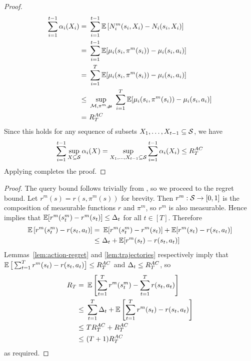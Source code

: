 \begin{proof}
\begin{align*}
\sum_{i=1}^{t-1} \alpha_i(X_i) =&\ \sum_{i=1}^{t-1} \operatorname*{\mathbb{E}}\left[N_i^m(s_i, X_i) - N_i(s_i, X_i)\right]\\
=&\ \sum_{i=1}^{t-1} \operatorname*{\mathbb{E}}[\mu_i(s_i, \pi^m(s_i)) - \mu_i(s_i, a_i)]\\
=&\ \sum_{i=1}^T \operatorname*{\mathbb{E}}[\mu_i(s_i, \pi^m(s_i)) - \mu_i(s_i, a_i)]\\
\le&\ \sup_{\mathcal{M}, \pi^m, \boldsymbol{\mu}}\ \sum_{i=1}^T \operatorname*{\mathbb{E}}[\mu_i(s_i, \pi^m(s_i)) - \mu_i(s_i, a_i)]\\
=&\ R_T^{AC}
\end{align*}
Since this holds for any sequence of subsets $X_1,\dots,X_{t-1} \subseteq \mathcal{S}$, we have
\begin{align*}
\sum_{i=1}^{t-1} \sup_{X\subseteq\mathcal{S}} \alpha_i(X)= \sup_{X_1,\dots,X_{t-1} \subseteq \mathcal{S}} \sum_{i=1}^{t-1} \alpha_i(X_i) \le R_T^{AC}
\end{align*}
Applying  completes the proof.
\end{proof}

\thmMain*

\begin{proof}
The query bound follows trivially from , so we proceed to the regret bound. Let $r^m(s) = r(s, \pi^m(s))$ for brevity. Then $r^m: \mathcal{S} \to [0,1]$ is the composition of measurable functions $r$ and $\pi^m$, so $r^m$ is also measurable. Hence  implies that $\operatorname*{\mathbb{E}}[r^m(s_t^m) - r^m(s_t)] \le \Delta_t$ for all $t \in [T]$. Therefore
\begin{align*}
\operatorname*{\mathbb{E}}\left[r^m(s_t^m) - r(s_t, a_t)\right] =&\ \operatorname*{\mathbb{E}}[r^m(s_t^m) - r^m(s_t)] + \operatorname*{\mathbb{E}}[r^m(s_t) - r(s_t, a_t)]\\
\le&\ \Delta_t +\operatorname*{\mathbb{E}}[r^m(s_t) - r(s_t, a_t)]
\end{align*}
Lemmas~\ref{lem:action-regret} and \ref{lem:trajectories} respectively imply that $\operatorname*{\mathbb{E}} \big[\sum_{t=1}^T r^m(s_t) - r(s_t, a_t)\big] \le  R_T^{AC}$ and $\Delta_t \le R_T^{AC}$, so
\begin{align*}
R_T =&\ \operatorname*{\mathbb{E}}\left[\sum_{t=1}^T r^m(s_t^m) - \sum_{t=1}^T r(s_t, a_t)\right]\\
\le&\ \sum_{t=1}^T \Delta_t +\operatorname*{\mathbb{E}} \left[\sum_{t=1}^T r^m(s_t) - r(s_t, a_t)\right]\\
\le&\ T R_T^{AC} +R_T^{AC}\\
\le&\ (T+1) R_T^{AC}
\end{align*}
as required.
\end{proof}

